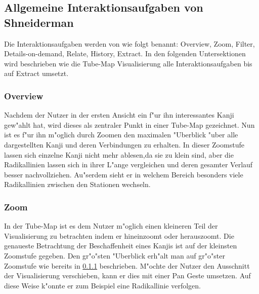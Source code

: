 \subsection{Allgemeine Interaktionsaufgaben von Shneiderman}
Die Interaktionsaufgaben werden von \cite{eyeshaveit96} wie folgt benannt: Overview, Zoom, Filter, Details-on-demand, Relate, History, Extract. In den folgenden Untersektionen wird beschrieben wie die Tube-Map Visualisierung alle Interaktionsaufgaben bis auf Extract umsetzt. 

\subsubsection{Overview}\label{Overview}
Nachdem der Nutzer in der ersten Ansicht ein f"ur ihn interessantes Kanji gew"ahlt hat, wird dieses als zentraler Punkt in einer Tube-Map gezeichnet. Nun ist es f"ur ihn m"oglich durch Zoomen den maximalen "Uberblick "uber alle dargestellten Kanji und deren Verbindungen zu erhalten. In dieser Zoomstufe lassen sich einzelne Kanji nicht mehr ablesen,da sie zu klein sind, aber die Radikallinien lassen sich in ihrer L"ange vergleichen und deren gesamter Verlauf besser nachvollziehen. Au"serdem sieht er in welchem Bereich besonders viele Radikallinien zwischen den Stationen wechseln.

\subsubsection{Zoom}
In der Tube-Map ist es dem Nutzer m"oglich einen kleineren Teil der Visualisierung zu betrachten indem er hineinzoomt oder herauszoomt. Die genaueste Betrachtung der Beschaffenheit eines Kanjis ist auf der kleinsten Zoomstufe gegeben. Den gr"o"sten "Uberblick erh"alt man auf gr"o"ster Zoomstufe wie bereits in \ref{Overview} beschrieben. M"ochte der Nutzer den Ausschnitt der Visualisierung verschieben, kann er dies mit einer Pan Geste umsetzen. Auf diese Weise k"onnte er zum Beispiel eine Radikallinie verfolgen.

